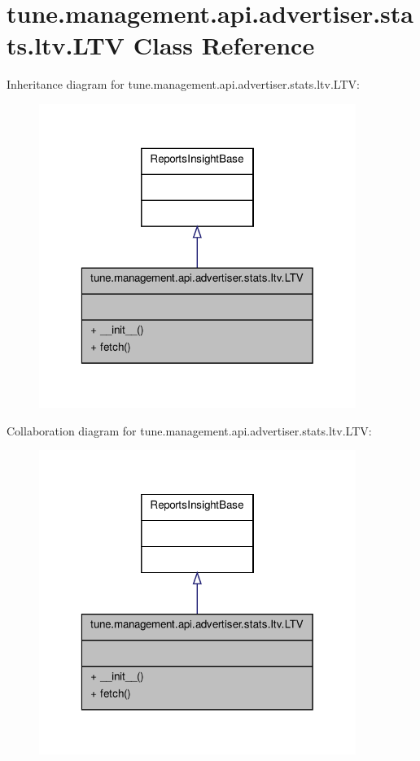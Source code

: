 \hypertarget{classtune_1_1management_1_1api_1_1advertiser_1_1stats_1_1ltv_1_1LTV}{\section{tune.\-management.\-api.\-advertiser.\-stats.\-ltv.\-L\-T\-V Class Reference}
\label{classtune_1_1management_1_1api_1_1advertiser_1_1stats_1_1ltv_1_1LTV}
}


Inheritance diagram for tune.\-management.\-api.\-advertiser.\-stats.\-ltv.\-L\-T\-V\-:
\nopagebreak
\begin{figure}[H]
\begin{center}
\leavevmode
\includegraphics[width=292pt]{classtune_1_1management_1_1api_1_1advertiser_1_1stats_1_1ltv_1_1LTV__inherit__graph}
\end{center}
\end{figure}


Collaboration diagram for tune.\-management.\-api.\-advertiser.\-stats.\-ltv.\-L\-T\-V\-:
\nopagebreak
\begin{figure}[H]
\begin{center}
\leavevmode
\includegraphics[width=292pt]{classtune_1_1management_1_1api_1_1advertiser_1_1stats_1_1ltv_1_1LTV__coll__graph}
\end{center}
\end{figure}
